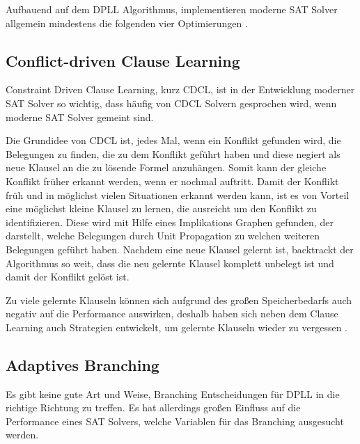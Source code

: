 \documentclass[conference,compsoc,final,a4paper]{IEEEtran}
\begin{document}
Aufbauend auf dem DPLL Algorithmus, implementieren moderne SAT Solver allgemein mindestens die folgenden vier Optimierungen \cite{anatomy_of_modern_sat_solvers}.

\subsection{Conflict-driven Clause Learning}
Constraint Driven Clause Learning, kurz CDCL, ist in der Entwicklung moderner SAT Solver so wichtig, dass häufig von CDCL Solvern gesprochen wird, wenn moderne SAT Solver gemeint sind.

Die Grundidee von CDCL ist, jedes Mal, wenn ein Konflikt gefunden wird, die Belegungen zu finden, die zu dem Konflikt geführt haben und diese negiert als neue Klausel an die zu lösende Formel anzuhängen. Somit kann der gleiche Konflikt früher erkannt werden, wenn er nochmal auftritt. Damit der Konflikt früh und in möglichst vielen Situationen erkannt werden kann, ist es von Vorteil eine möglichst kleine Klausel zu lernen, die ausreicht um den Konflikt zu identifizieren. Diese wird mit Hilfe eines Implikations Graphen gefunden, der darstellt, welche Belegungen durch Unit Propagation zu welchen weiteren Belegungen geführt haben. Nachdem eine neue Klausel gelernt ist, backtrackt der Algorithmus so weit, dass die neu gelernte Klausel komplett unbelegt ist und damit der Konflikt gelöst ist. \cite{anatomy_of_modern_sat_solvers}


Zu viele gelernte Klauseln können sich aufgrund des großen Speicherbedarfs auch negativ auf die Performance auswirken, deshalb haben sich neben dem Clause Learning auch Strategien entwickelt, um gelernte Klauseln wieder zu vergessen \cite{sat_solving_techniques_biliography}.

\subsection{Adaptives Branching}
Es gibt keine gute Art und Weise, Branching Entscheidungen für DPLL in die richtige Richtung zu treffen. Es hat allerdings großen Einfluss auf die Performance eines SAT Solvers, welche Variablen für das Branching ausgesucht werden. \cite{sat_solving_techniques_biliography}
\end{document}
